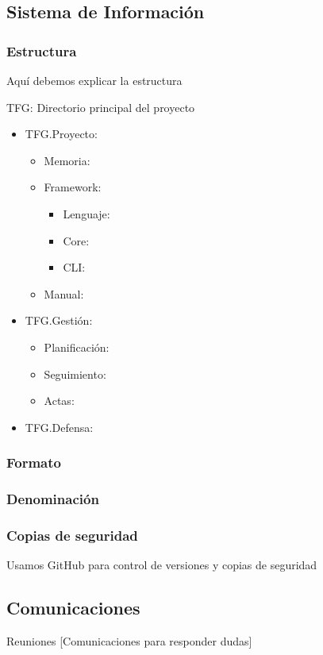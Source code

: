 \subsection{Sistema de Información}
\subsubsection{Estructura}
Aquí debemos explicar la estructura

TFG: Directorio principal del proyecto

\begin{itemize}
    \item TFG.Proyecto:
    \begin{itemize}
        \item Memoria:
        \item Framework:
        \begin{itemize}
            \item Lenguaje:
            \item Core:
            \item CLI:
        \end{itemize}
        \item Manual:
    \end{itemize}
    \item TFG.Gestión:
    \begin{itemize}
        \item Planificación:
        \item Seguimiento:
        \item Actas:
    \end{itemize}
    \item TFG.Defensa:
\end{itemize}

\subsubsection{Formato}
\subsubsection{Denominación}
\subsubsection{Copias de seguridad}
Usamos GitHub para control de versiones y copias de seguridad

\subsection{Comunicaciones}
Reuniones
[Comunicaciones para responder dudas]